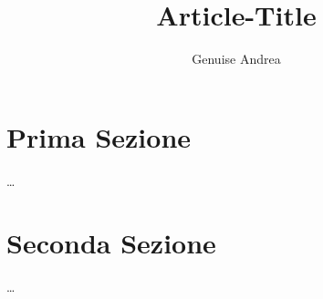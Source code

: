\documentclass[a4paper]{article}
\author{Genuise Andrea}
\title{Article-Title}
\begin{document}
\maketitle

\tableofcontents

\section{Prima Sezione}
\dots

\section{Seconda Sezione}
\dots
\end{document}
